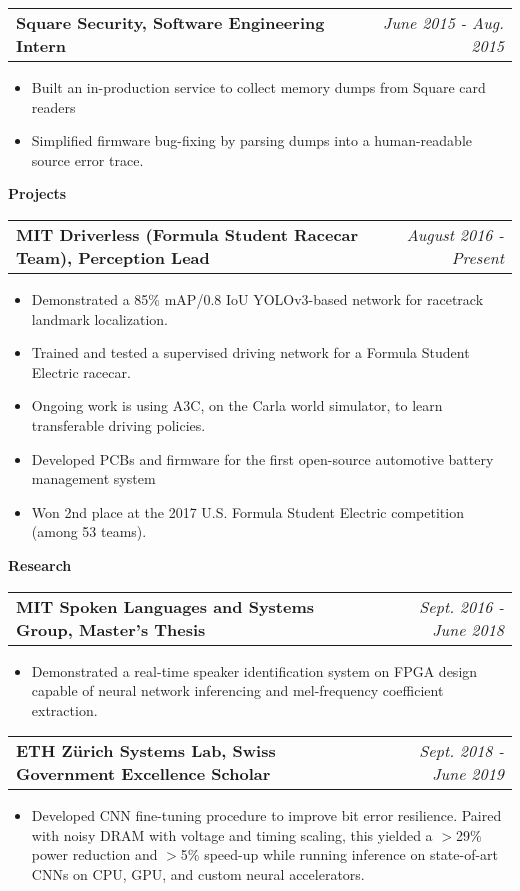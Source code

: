 \documentclass[letterpaper,11pt]{article}
\makeatletter
\newcommand{\resitem}[1]{\item[--] #1 \vspace{-4pt}}
\newcommand{\ressubheadingtwo}[2] {
\begin{tabular*}{7in}{l@{\extracolsep{\fill}}r}
	\textbf{#1} & \textit{#2} \\
\end{tabular*}\vspace{-6pt}}
\makeatother
\begin{document}
	\ressubheadingtwo{Square Security, Software Engineering Intern}{June 2015 - Aug. 2015}
	\begin{itemize}
            \itemsep0em
            \resitem{Built an in-production service to collect memory dumps from Square card readers}
            \resitem{Simplified firmware bug-fixing by parsing dumps into a human-readable source error trace.}
	\end{itemize}
    \vspace{0.05in}

\large \textbf{Projects\vspace{1mm}} \normalsize

    \ressubheadingtwo{MIT Driverless (Formula Student Racecar Team), Perception Lead}{August 2016 - Present}
    \begin{itemize}
        \itemsep0em
        \resitem{Demonstrated a 85\% mAP/0.8 IoU YOLOv3-based network for racetrack landmark localization.}
        \resitem{Trained and tested a supervised driving network for a Formula Student Electric racecar.}
        \resitem{Ongoing work is using A3C, on the Carla world simulator, to learn transferable driving policies.}
        \resitem{Developed PCBs and firmware for the first open-source automotive battery management system}
        \resitem{Won 2nd place at the 2017 U.S. Formula Student Electric competition (among 53 teams).}
    \end{itemize}

\large \textbf{Research \vspace{1mm}} \normalsize
    \vspace{0.04in}

	\ressubheadingtwo{MIT Spoken Languages and Systems Group, Master's Thesis}{Sept. 2016 - June 2018}{}
	\begin{itemize}
            \itemsep0em
            \resitem{Demonstrated a real-time speaker identification system on FPGA design capable of neural network
inferencing and mel-frequency coefficient extraction.}
	\end{itemize}

    \ressubheadingtwo{ETH Z{\"u}rich Systems Lab, Swiss Government Excellence Scholar}{Sept. 2018 - June 2019}{}
	\begin{itemize}
            \itemsep0em
            \resitem{Developed CNN fine-tuning procedure to improve bit error resilience. Paired with noisy DRAM with voltage and timing scaling, this yielded a $>$29\% power reduction and $>$5\% speed-up while running inference on state-of-art CNNs on CPU, GPU, and custom neural accelerators.}
	\end{itemize}
\end{document}
